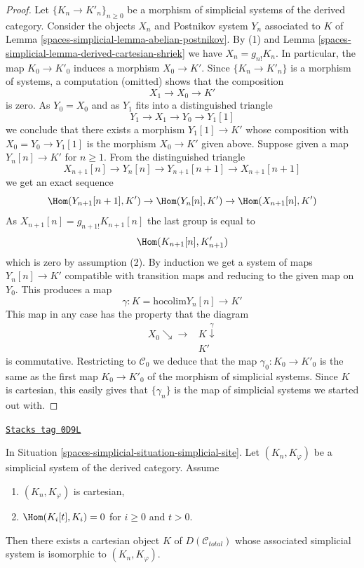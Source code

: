 \begin{proof}
Let $\{K_n \to K'_n\}_{n \geq 0}$
be a morphism of simplicial systems of the derived category.
Consider the objects $X_n$ and Postnikov system $Y_n$
associated to $K$ of Lemma \ref{spaces-simplicial-lemma-abelian-postnikov}.
By (1) and Lemma \ref{spaces-simplicial-lemma-derived-cartesian-shriek} we have
$X_n = g_{n!}K_n$. In particular, the map $K_0 \to K'_0$
induces a morphism $X_0 \to K'$. Since $\{K_n \to K'_n\}$
is a morphism of systems, a computation (omitted) shows that
the composition
$$
X_1 \to X_0 \to K'
$$
is zero. As $Y_0 = X_0$ and as $Y_1$ fits into a distinguished
triangle
$$
Y_1 \to X_1 \to Y_0 \to Y_1[1]
$$
we conclude that there exists a morphism $Y_1[1] \to K'$ whose
composition with $X_0 = Y_0 \to Y_1[1]$ is the morphism $X_0 \to K'$
given above. Suppose given a map $Y_n[n] \to K'$ for $n \geq 1$.
From the distinguished triangle
$$
X_{n + 1}[n] \to Y_n[n] \to Y_{n + 1}[n + 1] \to X_{n + 1}[n + 1]
$$
we get an exact sequence
$$
\Hom(Y_{n + 1}[n + 1], K') \to
\Hom(Y_n[n], K') \to
\Hom(X_{n + 1}[n], K')
$$
As $X_{n + 1}[n] = g_{n + 1!}K_{n + 1}[n]$ the last group is equal to
$$
\Hom(K_{n + 1}[n], K'_{n + 1})
$$
which is zero by assumption (2). By induction we get a system of
maps $Y_n[n] \to K'$ compatible with transition maps and reducing
to the given map on $Y_0$. This produces a map
$$
\gamma :
K = \text{hocolim} Y_n[n]
\longrightarrow
K'
$$
This map in any case has the property that the diagram
$$
\begin{array}{cc}X_0 \searrow\longrightarrow & K \overset{\gamma}{\downarrow} \\  & K'\end{array}
$$
is commutative. Restricting to
$\mathcal{C}_0$ we deduce that the map $\gamma_0 : K_0 \to K'_0$
is the same as the first map $K_0 \to K'_0$ of the morphism
of simplicial systems. Since $K$ is cartesian, this easily gives that
$\{\gamma_n\}$ is the map of simplicial systems we started out with.
\end{proof}

\begin{lemma}
\label{spaces-simplicial-lemma-cartesian-object-derived-from-simplicial}
\href{https://stacks.math.columbia.edu/tag/0D9L}{\texttt{Stacks tag 0D9L}}

In Situation \ref{spaces-simplicial-situation-simplicial-site}. Let
$(K_n, K_\varphi)$ be a simplicial system of the derived category.
Assume
\begin{enumerate}
\item $(K_n, K_\varphi)$ is cartesian,
\item $\Hom(K_i[t], K_i) = 0$ for $i \geq 0$ and $t > 0$.
\end{enumerate}
Then there exists a cartesian object $K$ of $D(\mathcal{C}_{total})$
whose associated simplicial system is isomorphic to $(K_n, K_\varphi)$.
\end{lemma}


